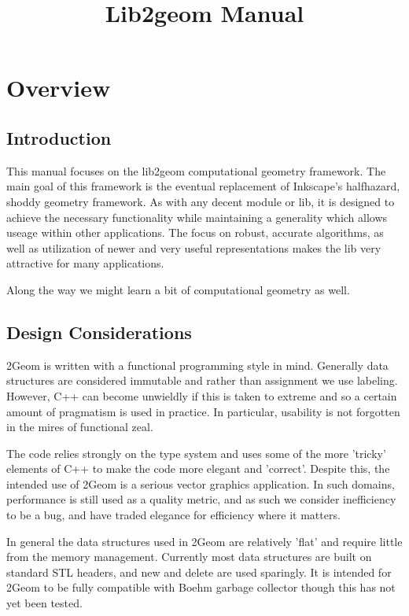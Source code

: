 
\title{Lib2geom Manual}

\newcommand{\code}[1]{\textsf{#1}}



\chapter{Overview}

\section{Introduction}

This manual focuses on the lib2geom computational geometry framework.
The main goal of this framework is the eventual replacement of
Inkscape's halfhazard, shoddy geometry framework. As with any decent
module or lib, it is designed to achieve the necessary functionality
while maintaining a generality which allows useage within other
applications.  The focus on robust, accurate algorithms, as well as
utilization of newer and very useful representations makes the lib
very attractive for many applications.

Along the way we might learn a bit of computational geometry as well.

\section{Design Considerations}

2Geom is written with a functional programming style in mind.
Generally data structures are considered immutable and rather than
assignment we use labeling.  However, C++ can become unwieldly if
this is taken to extreme and so a certain amount of pragmatism is
used in practice.  In particular, usability is not forgotten in the
mires of functional zeal.

The code relies strongly on the type system and uses some of the more
'tricky' elements of C++ to make the code more elegant and 'correct'.
Despite this, the intended use of 2Geom is a serious vector graphics
application. In such domains, performance is still used as a quality
metric, and as such we consider inefficiency to be a bug, and have
traded elegance for efficiency where it matters.

In general the data structures used in 2Geom are relatively 'flat'
and require little from the memory management.  Currently most data
structures are built on standard STL headers\cite{stl}, and new and
delete are used sparingly.  It is intended for 2Geom to be fully
compatible with Boehm garbage collector\cite{boehm} though this has
not yet been tested.

